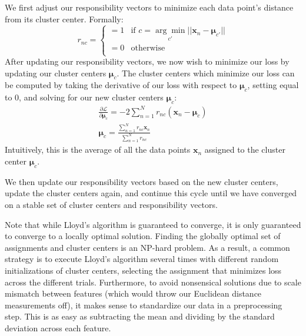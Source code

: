 \begin{derivation}
	We first adjust our responsibility vectors to minimize each data point's distance from its cluster center. Formally:
	\begin{equation} \label{responsibility-vector-update}
		r_{nc} = \begin{cases}
		 	= 1 & \text{if $c = \underset{c'}{\arg\min} ||\textbf{x}_{n} - \boldsymbol{\mu}_{c'}||$} \\
			= 0 & \text{otherwise} \\
		\end{cases}
	\end{equation}
	After updating our responsibility vectors, we now wish to minimize our loss by updating our cluster centers $\boldsymbol{\mu}_{c}$. The cluster centers which minimize our loss can be computed by taking the derivative of our loss with respect to $\boldsymbol{\mu}_{c}$, setting equal to 0, and solving for our new cluster centers $\boldsymbol{\mu}_{c}$:
	\begin{equation} \label{update-cluster-centers}
		\begin{aligned}
			\frac{\partial \mathcal{L}}{\partial \boldsymbol{\mu}_{c}} = -2 \sum_{n=1}^{N} r_{nc} (\textbf{x}_{n} - \boldsymbol{\mu}_{c}) \\
			\boldsymbol{\mu}_{c} = \frac{\sum_{n=1}^{N} r_{nc} \textbf{x}_{n}}{\sum_{n=1}^{N} r_{nc}}
		\end{aligned}
	\end{equation}
	Intuitively, this is the average of all the data points $\textbf{x}_{n}$ assigned to the cluster center $\boldsymbol{\mu}_{c}$.

	We then update our responsibility vectors based on the new cluster centers, update the cluster centers again, and continue this cycle until we have converged on a stable set of cluster centers and responsibility vectors.
\end{derivation}

Note that while Lloyd's algorithm is guaranteed to converge, it is only guaranteed to converge to a locally optimal solution. Finding the globally optimal set of assignments and cluster centers is an NP-hard problem. As a result, a common strategy is to execute Lloyd's algorithm several times with different random initializations of cluster centers, selecting the assignment that minimizes loss across the different trials. Furthermore, to avoid nonsensical solutions due to scale mismatch between features (which would throw our Euclidean distance measurements off), it makes sense to standardize our data in a preprocessing step. This is as easy as subtracting the mean and dividing by the standard deviation across each feature.

